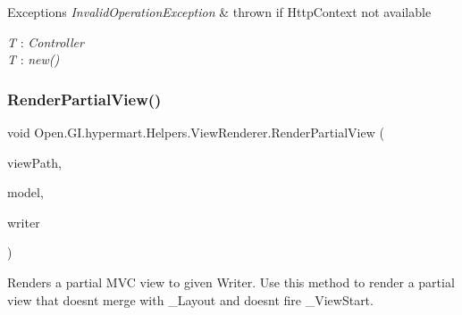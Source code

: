\begin{DoxyExceptions}{Exceptions}
{\em Invalid\+Operation\+Exception} & thrown if Http\+Context not available\\
\hline
\end{DoxyExceptions}
\begin{Desc}
\item[Type Constraints]\begin{description}
\item[{\em T} : {\em Controller}]\item[{\em T} : {\em new()}]\end{description}
\end{Desc}
\hypertarget{class_open_1_1_g_i_1_1hypermart_1_1_helpers_1_1_view_renderer_af41730f2378765d4eacaae51b661ed45}{}\label{class_open_1_1_g_i_1_1hypermart_1_1_helpers_1_1_view_renderer_af41730f2378765d4eacaae51b661ed45} 
\subsubsection{\texorpdfstring{Render\+Partial\+View()}{RenderPartialView()}\hspace{0.1cm}{\footnotesize\ttfamily [1/3]}}
{\footnotesize\ttfamily void Open.\+G\+I.\+hypermart.\+Helpers.\+View\+Renderer.\+Render\+Partial\+View (\begin{DoxyParamCaption}\item[{string}]{view\+Path,  }\item[{object}]{model,  }\item[{Text\+Writer}]{writer }\end{DoxyParamCaption})}



Renders a partial M\+VC view to given Writer. Use this method to render a partial view that doesn\textquotesingle{}t merge with \+\_\+\+Layout and doesn\textquotesingle{}t fire \+\_\+\+View\+Start. 


